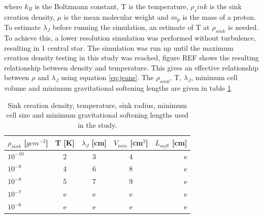 \documentclass[fleqn,usenatbib]{mnras}
\begin{document}
where $k_B$ is the Boltzmann constant, T is the temperature, $\rho_sink$ is the sink creation density, $\mu$ is the mean molecular weight and $m_p$ is the mass of a proton. To estimate $\lambda_J$ before running the simulation, an estimate of T at $\rho_{sink}$ is needed. To achieve this, a lower resolution simulation was performed without turbulence, resulting in 1 central star. The simulation was run up until the maximum creation density testing in this study was reached, figure REF shows the resulting relationship between density and temperature. This gives an effective relationship between $\rho$ and $\lambda_J$ using equation \ref{eq:jeans}. The $\rho_{sink}$, T, $\lambda_J$, minimum cell volume and minimum gravitational softening lengths are given in table \ref{table:1}.

\begin{table}
	\centering
	\caption{Sink creation density, temperature, sink radius, minimum cell size and minimum gravitational softening lengths used in the study.}
	\label{table:1}
	\begin{tabular}{lcccr} %
		\hline
		$\rho_{sink}$ [$gcm^{-3}$] & T [K] & $\lambda_J$ [cm] & $V_{min}$ [cm$^{3}$] & $L_{soft}$ [cm]\\
		\hline
		$10^{-10}$ & 2 & 3 & 4 & e\\
		$10^{-9}$ & 4 & 6 & 8 & e\\
		$10^{-8}$ & 5 & 7 & 9 & e\\
		$10^{-7}$ & e & e & e & e\\
		$10^{-6}$ & e & e & e & e\\
		\hline
	\end{tabular}
\end{table}
\end{document}
